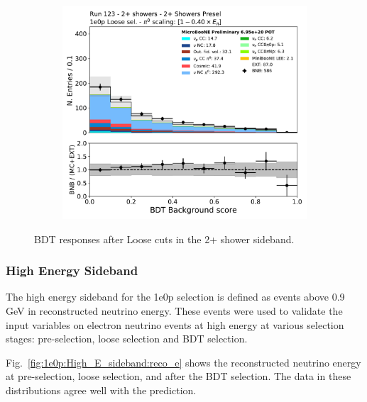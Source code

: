 \begin{figure}[H]
    \begin{center}
    \begin{subfigure}{0.45\textwidth}
    \includegraphics[width=1.00\textwidth]{Sidebands/Figures/TwoShr_1e0pSel_newSamples/bkg_score_loose.pdf}
    \end{subfigure}
    \caption{\label{fig:sb:1eNp:twopshr:loose:bdt} BDT responses after \zpsel Loose cuts in the 2+ shower sideband.}
    \end{center}
\end{figure}
\subsubsection{High Energy Sideband}
\label{sec:sideband:he}
The high energy sideband for the 1e0p selection is defined as events above 0.9 GeV in reconstructed neutrino energy.  These events were used to validate the input variables on electron neutrino events at high energy at various selection stages: pre-selection, loose selection and BDT selection. 

Fig.~\ref{fig:1e0p:High_E_sideband:reco_e} shows the reconstructed neutrino energy at pre-selection, loose selection, and after the BDT selection. The data in these distributions agree well with the prediction. 

